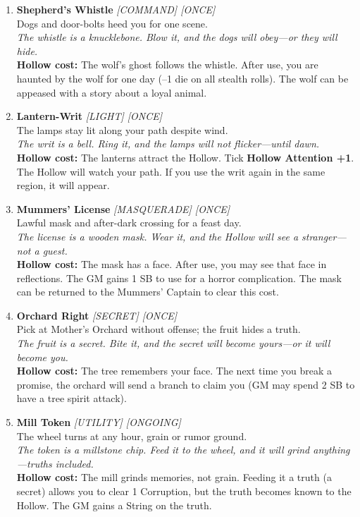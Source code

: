 \begin{enumerate}
\item \textbf{Shepherd's Whistle} \hfill \textit{[COMMAND] [ONCE]} \\
  Dogs and door-bolts heed you for one scene. \\
  \textit{The whistle is a knucklebone. Blow it, and the dogs will obey---or they will hide.} \\
  \textbf{Hollow cost:} The wolf's ghost follows the whistle. After use, you are haunted by the wolf for one day (--1 die on all stealth rolls). The wolf can be appeased with a story about a loyal animal.

\item \textbf{Lantern-Writ} \hfill \textit{[LIGHT] [ONCE]} \\
  The lamps stay lit along your path despite wind. \\
  \textit{The writ is a bell. Ring it, and the lamps will not flicker---until dawn.} \\
  \textbf{Hollow cost:} The lanterns attract the Hollow. Tick \textbf{Hollow Attention +1}. The Hollow will watch your path. If you use the writ again in the same region, it will appear.

\item \textbf{Mummers' License} \hfill \textit{[MASQUERADE] [ONCE]} \\
  Lawful mask and after-dark crossing for a feast day. \\
  \textit{The license is a wooden mask. Wear it, and the Hollow will see a stranger---not a guest.} \\
  \textbf{Hollow cost:} The mask has a face. After use, you may see that face in reflections. The GM gains 1 SB to use for a horror complication. The mask can be returned to the Mummers' Captain to clear this cost.

\item \textbf{Orchard Right} \hfill \textit{[SECRET] [ONCE]} \\
  Pick at Mother's Orchard without offense; the fruit hides a truth. \\
  \textit{The fruit is a secret. Bite it, and the secret will become yours---or it will become you.} \\
  \textbf{Hollow cost:} The tree remembers your face. The next time you break a promise, the orchard will send a branch to claim you (GM may spend 2 SB to have a tree spirit attack).

\item \textbf{Mill Token} \hfill \textit{[UTILITY] [ONGOING]} \\
  The wheel turns at any hour, grain or rumor ground. \\
  \textit{The token is a millstone chip. Feed it to the wheel, and it will grind anything---truths included.} \\
  \textbf{Hollow cost:} The mill grinds memories, not grain. Feeding it a truth (a secret) allows you to clear 1 Corruption, but the truth becomes known to the Hollow. The GM gains a String on the truth.


\end{enumerate}
